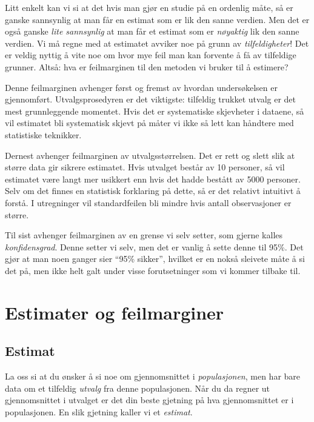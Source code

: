 \documentclass[
  letterpaper,
  DIV=11,
  numbers=noendperiod]{scrreprt}
\theoremstyle{definition}
\theoremstyle{remark}
\begin{document}
Litt enkelt kan vi si at det hvis man gjør en studie på en ordenlig
måte, så er ganske sannsynlig at man får en estimat som er lik den sanne
verdien. Men det er også ganske \emph{lite sannsynlig} at man får et
estimat som er \emph{nøyaktig} lik den sanne verdien. Vi må regne med at
estimatet avviker noe på grunn av \emph{tilfeldigheter}! Det er veldig
nyttig å vite noe om hvor mye feil man kan forvente å få av tilfeldige
grunner. Altså: hva er feilmarginen til den metoden vi bruker til å
estimere?

Denne feilmarginen avhenger først og fremst av hvordan undersøkelsen er
gjennomført. Utvalgsprosedyren er det viktigste: tilfeldig trukket
utvalg er det mest grunnleggende momentet. Hvis det er systematiske
skjevheter i dataene, så vil estimatet bli systematisk skjevt på måter
vi ikke så lett kan håndtere med statistiske teknikker.

Dernest avhenger feilmarginen av utvalgsstørrelsen. Det er rett og slett
slik at større data gir sikrere estimatet. Hvis utvalget består av 10
personer, så vil estimatet være langt mer usikkert enn hvis det hadde
bestått av 5000 personer. Selv om det finnes en statistisk forklaring på
dette, så er det relativt intuitivt å forstå. I utregninger vil
standardfeilen bli mindre hvis antall observasjoner er større.

Til sist avhenger feilmarginen av en grense vi selv setter, som gjerne
kalles \emph{konfidensgrad}. Denne setter vi selv, men det er vanlig å
sette denne til 95\%. Det gjør at man noen ganger sier ``95\% sikker'',
hvilket er en nokså sleivete måte å si det på, men ikke helt galt under
visse forutsetninger som vi kommer tilbake til.

\hypertarget{estimater-og-feilmarginer}{%
\section{Estimater og feilmarginer}\label{estimater-og-feilmarginer}}

\hypertarget{estimat}{%
\subsection{Estimat}\label{estimat}}

La oss si at du ønsker å si noe om gjennomsnittet i \emph{populasjonen},
men har bare data om et tilfeldig \emph{utvalg} fra denne populasjonen.
Når du da regner ut gjennomsnittet i utvalget er det din beste gjetning
på hva gjennomsnittet er i populasjonen. En slik gjetning kaller vi et
\emph{estimat}.
\end{document}
